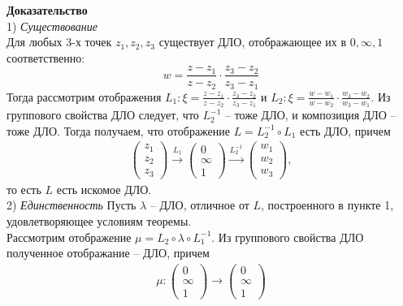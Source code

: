 \textbf{Доказательство} \\
1) \textit{Существование} \\
Для любых 3-х точек $z_1, z_2, z_3$
существует ДЛО, отображающее их в $0, \infty, 1$ соответственно:
$$
w = \frac{z - z_1}{z - z_2}\cdot\frac{z_3 - z_2}{z_3 - z_1}
$$
Тогда рассмотрим отображения $L_1: \xi = \frac{z - z_1}{z - z_2}\cdot\frac{z_3 - z_2}{z_3 - z_1}$
и $L_2: \xi = \frac{w - w_1}{w - w_2}\cdot\frac{w_3 - w_2}{w_3 - w_1}
$. Из группового свойства ДЛО следует, что $L_2^{-1}$ -- тоже ДЛО, и композиция ДЛО -- тоже ДЛО.
Тогда получаем, что отображение $L = L_2^{-1} \circ L_1$ есть ДЛО, причем
\begin{equation}
\begin{gathered}
    \begin{pmatrix}
        z_1 \\
        z_2 \\
        z_3
    \end{pmatrix}
    \overset{L_1}{\rightarrow}
    \begin{pmatrix}
        0 \\
        \infty \\
        1
    \end{pmatrix}
    \overset{L_2^{-1}}{\rightarrow}
    \begin{pmatrix}
        w_1 \\
        w_2 \\
        w_3
    \end{pmatrix},
\end{gathered}
\end{equation}
то есть $L$ есть искомое ДЛО. \\
2) \textit{Единственность}
Пусть $\lambda$ -- ДЛО, отличное от $L$, построенного в пункте 1, удовлетворяющее условиям теоремы. \\
Рассмотрим отображение $\mu = L_2 \circ \lambda \circ L_1^{-1}$. Из группового свойства ДЛО полученное отображание -- ДЛО, причем
\begin{equation}
\begin{gathered}
    \mu: 
    \begin{pmatrix}
        0 \\
        \infty \\
        1
    \end{pmatrix}
    \rightarrow 
    \begin{pmatrix}
        0 \\
        \infty \\
        1
    \end{pmatrix}
\end{gathered}
\end{equation}
